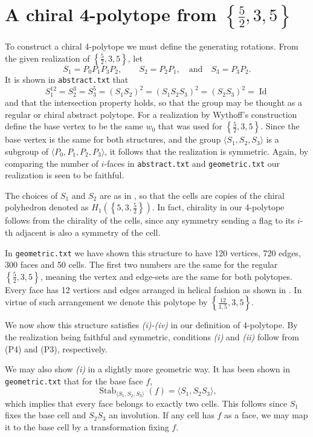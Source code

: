\documentclass{article}
\theoremstyle{definition}
\DeclareMathOperator{\Id}{Id}
\DeclareMathOperator{\Stab}{Stab}
\begin{document}
	\section{A chiral 4-polytope from $\left\{\frac{5}{2},3,5\right\}$}
	To construct a chiral 4-polytope we must define the generating rotations. From the given realization of $\left\{\frac{5}{2},3,5\right\}$, let
		\[S_1=P_0P_1P_3P_2,\qquad S_2=P_2P_1,\quad\text{and}\quad S_3=P_3P_2.\]
	It is shown in \texttt{abstract.txt} that
		\[S_1^{12}=S_2^3=S_3^5=(S_1S_2)^2=(S_1S_2S_3)^2=(S_2S_3)^2=\Id\]
	and that the intersection property holds, so that the group may be thought as a regular or chiral abstract polytope. For a realization by Wythoff's construction define the base vertex to be the same $w_0$ that was used for $\left\{\frac{5}{2},3,5\right\}$. Since the base vertex is the same for both structures, and the group $\langle S_1,S_2,S_3\rangle$ is a subgroup of $\langle P_0,P_1,P_2,P_3\rangle$, it follows that the realization is symmetric. Again, by comparing the number of $i$-faces in \texttt{abstract.txt} and \texttt{geometric.txt} our realization is seen to be faithful.
	
	The choices of $S_1$ and $S_2$ are as in  \cite{petcox}, so that the cells are copies of the chiral polyhedron denoted as $H_1(\left\{5,3,\frac{5}{2}\right\})$. In fact, chirality in our 4-polytope follows from the chirality of the cells, since any symmetry sending a flag to its $i$-th adjacent is also a symmetry of the cell.
	
	In \texttt{geometric.txt} we have shown this structure to have 120 vertices, 720 edges, 300 faces and 50 cells. The first two numbers are the same for the regular $\left\{\frac{5}{2},3,5\right\}$, meaning the vertex and edge-sets are the same for both polytopes. Every face has 12 vertices and edges arranged in helical fashion as shown in \cite{petcox}. In virtue of such arrangement we denote this polytope by $\left\{\frac{12}{1,5},3,5\right\}$.
	
	
	We now show this structure satisfies \textit{(i)-(iv)} in our definition of 4-polytope. By the realization being faithful and symmetric, conditions \textit{(i)} and \textit{(ii)} follow from (P4) and (P3), respectively.
	
	We may also show \textit{(i)} in a slightly more geometric way. It has been shown in  \texttt{geometric.txt} that for the base face $f$,
	\begin{equation*}\label{ec:stab-face}
		\Stab_{\langle S_1,S_2,S_3\rangle}(f)=\langle S_1,S_2S_3\rangle,
	\end{equation*}
	which implies that every face belongs to exactly two cells. This follows since $S_1$ fixes the base cell and $S_2S_3$ an involution. If any cell has $f$ as a face, we may map it to the base cell by a transformation fixing $f$.
	
\end{document}
